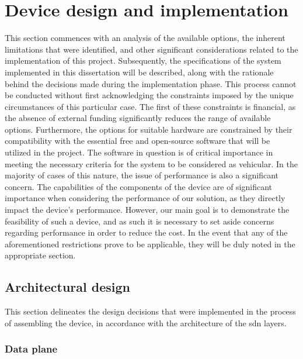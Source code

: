\chapter{Device design and implementation }
\label{cha:device_design}


This section commences with an analysis of the available options, the inherent limitations that were identified, and other significant considerations related to the implementation of this project. Subsequently, the specifications of the system implemented in this dissertation will be described, along with the rationale behind the decisions made during the implementation phase.
This process cannot be conducted without first acknowledging the constraints imposed by the unique circumstances of this particular case. The first of these constraints is financial, as the absence of external funding significantly reduces the range of available options. Furthermore, the options for suitable hardware are constrained by their compatibility with the essential free and open-source software that will be utilized in the project. The software in question is of critical importance in meeting the necessary criteria for the system to be considered as vehicular.
In the majority of cases of this nature, the issue of performance is also a significant concern. The capabilities of the components of the device are of significant importance when considering the performance of our solution, as they directly impact the device’s performance. However, our main goal is to demonstrate the feasibility of such a device, and as such it is necessary to set aside concerns regarding performance in order to reduce the cost.
In the event that any of the aforementioned restrictions prove to be applicable, they will be duly noted in the appropriate section.
\section{Architectural design}

This section delineates the design decisions that were implemented in the process of assembling the device, in accordance with the architecture of the \gls{sdn} layers.

\subsection{Data plane}


